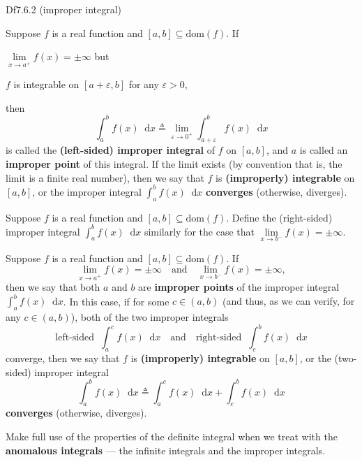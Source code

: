 \documentclass{article}
\newcommand{\dif}{\mathop{}\!\mathrm{d}}
\begin{document}
\begin{Df}{Df7.6.2 (improper integral)}
    \begin{compactenum}
        \item Suppose $f$ is a real function and $[a, b]\subseteq\text{dom}(f)$. If 
        \begin{compactenum}
            \item $\lim\limits_{x\to a^+}f(x) = \pm\infty$ but
            \item $f$ is integrable on $[a+\varepsilon, b]$ for any $\varepsilon>0$,
        \end{compactenum}
        then 
        $$\int_a^b f(x)\dif x \triangleq \lim_{\varepsilon\to 0^+}\int_{a+\varepsilon}^b f(x)\dif x$$
        is called the \textbf{(left-sided) improper integral} of $f$ on $[a, b]$, and $a$ is called an \textbf{improper point} of this integral. If the limit exists (by convention that is, the limit is a finite real number), then we say that $f$ is \textbf{(improperly) integrable} on $[a, b]$, or the improper integral $\int_a^b f(x)\dif x$ \textbf{converges} (otherwise, diverges).
        \item Suppose $f$ is a real function and $[a, b]\subseteq\text{dom}(f)$. Define the (right-sided) improper integral $\int_a^b f(x)\dif x$ similarly for the case that $\lim\limits_{x\to b^-}f(x) = \pm\infty$.
        \item Suppose $f$ is a real function and $[a, b]\subseteq\text{dom}(f)$. If 
        $$ \lim_{x\to a^+}f(x) = \pm\infty \quad \text{and} \quad \lim_{x\to b^-}f(x) = \pm\infty, $$
        then we say that both $a$ and $b$ are \textbf{improper points} of the improper integral $\int_a^b f(x)\dif x$. In this case, if for some $c\in(a, b)$ (\textcolor{Th}{and thus, as we can verify, for any $c\in(a, b)$}), both of the two improper integrals
        $$ \text{left-sided}\;\; \int_a^c f(x)\dif x \quad \text{and} \quad \text{right-sided}\;\; \int_c^b f(x)\dif x $$ 
        converge, then we say that $f$ is \textbf{(improperly) integrable} on $[a, b]$, or the (two-sided) improper integral
        $$\int_a^b f(x)\dif x \triangleq \int_a^c f(x)\dif x + \int_c^b f(x)\dif x$$
        \textbf{converges} (otherwise, diverges).
    \end{compactenum}
\end{Df}

\begin{Rmk}{}
    Make full use of the properties of the definite integral when we treat with the \textcolor{Df}{\textbf{anomalous integrals} — the infinite integrals and the improper integrals}.
\end{Rmk}
\end{document}
